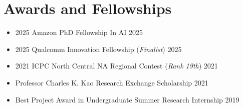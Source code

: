 \documentclass[11pt,letterpaper,roman,colorlinks=true,urlcolor=brown]{moderncv}
\begin{document}
\section{Awards and Fellowships}
\begin{itemize}
    \item 2025 Amazon PhD Fellowship In AI \hfill 2025
    \item 2025 Qualcomm Innovation Fellowship (\textit{Finalist}) \hfill 2025
    \item 2021 ICPC North Central NA Regional Contest (\textit{Rank 19th}) \hfill 2021
    \item Professor Charles K. Kao Research Exchange Scholarship \hfill 2021
    \item Best Project Award in Undergraduate Summer Research Internship \hfill 2019
\end{itemize}
\end{document}
